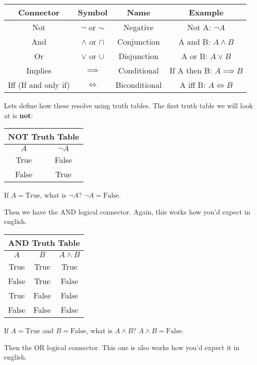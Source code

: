 \begin{tabular}{c|c|c|c}
	\hline
	Connector & Symbol & Name & Example\\
	\hline
	Not & $\neg$ or $\sim$ & Negative & Not A: $\neg A$\\
	And & $\land$ or $\cap$ & Conjunction & A and B: $A \land B$\\
	Or & $\lor$ or $\cup$ & Disjunction & A or B: $A \lor B$\\
	Implies & $\implies$ & Conditional & If A then B: $A \implies B$\\
	Iff (If and only if) & $\iff$ & Biconditional & A iff B: $A \iff B$\\
\hline
\end{tabular}

Lets define how these resolve using truth tables. The first truth table we will look at is {\bf not}:

\begin{tabular}{c|c}
	\hline
	\multicolumn{2}{c}{NOT Truth Table}\\
	\hline
	$A$ & $\neg A$\\
	\hline
	True & False\\
	False & True\\
	\hline
\end{tabular}

\begin{boxexample}{}{}
	If $A=\text{True}$, what is $\neg A$? $\neg A=\text{False}$.
\end{boxexample}

Then we have the AND logical connector. Again, this works how you'd expect in english.

\begin{tabular}{c|c|c}
	\hline
	\multicolumn{3}{c}{AND Truth Table}\\
	\hline
	$A$ & $B$ & $A \land B$\\
	\hline
	True & True & True\\
	False & True & False\\
	True & False & False\\
	False & False & False\\
	\hline
\end{tabular}

\begin{boxexample}{}{}
	If $A=\text{True}$ and $B=\text{False}$, what is $A \land B$? $A \land B = \text{False}$.
\end{boxexample}

Then the OR logical connector. This one is also works how you'd expect it in english.


